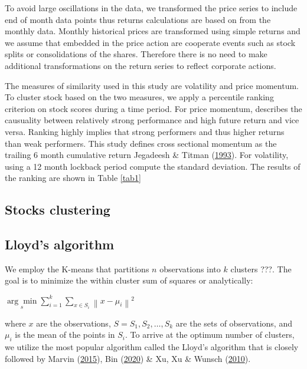 \documentclass[11pt,preprint, authoryear]{elsarticle}
\numberwithin{equation}{section}
\numberwithin{figure}{section}
\numberwithin{table}{section}
\begin{document}
To avoid large oscillations in the data, we transformed the price series
to include end of month data points thus returns calculations are based
on from the monthly data. Monthly historical prices are transformed
using simple returns and we assume that embedded in the price action are
cooperate events such as stock splits or consolidations of the shares.
Therefore there is no need to make additional transformations on the
return series to reflect corporate actions.

The measures of similarity used in this study are volatility and price
momentum. To cluster stock based on the two measures, we apply a
percentile ranking criterion on stock scores during a time period. For
price momentum, describes the causuality between relatively strong
performance and high future return and vice versa. Ranking highly
implies that strong performers and thus higher returns than weak
performers. This study defines cross sectional momentum as the trailing
6 month cumulative return Jegadeesh \& Titman
(\protect\hyperlink{ref-jegadeesh1993returns}{1993}). For volatility,
using a 12 month lockback period compute the standard deviation. The
results of the ranking are shown in Table \ref{tab1}

\hypertarget{stocks-clustering}{%
\subsection{Stocks clustering}\label{stocks-clustering}}

\hypertarget{lloyds-algorithm}{%
\subsection{Lloyd's algorithm}\label{lloyds-algorithm}}

We employ the K-means that partitions \(n\) observations into \(k\)
clusters ???. The goal is to minimize the within cluster sum of squares
or analytically:

\(\underset{s}{\arg \min } \sum_{i=1}^k \sum_{x \in S_i}\left\|x-\mu_i\right\|^2\)

where \(x\) are the observations, \(S=S_1, S_2, \ldots, S_k\) are the
sets of observations, and \(\mu_i\) is the mean of the points in
\(S_i\). To arrive at the optimum number of clusters, we utilize the
most popular algorithm called the Lloyd's algorithm that is closely
followed by Marvin (\protect\hyperlink{ref-marvin2015creating}{2015}),
Bin (\protect\hyperlink{ref-bin2020k}{2020}) \& Xu, Xu \& Wunsch
(\protect\hyperlink{ref-xu2010clustering}{2010}).
\end{document}
